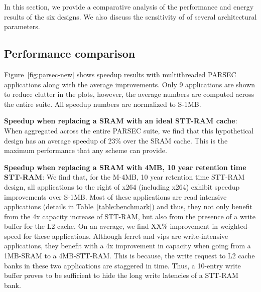 In this section, we provide a comparative analysis of the performance and energy results of the six designs.
We also discuss the sensitivity of of several architectural parameters.



\begin{figure*} [t]
\centering
 \caption{\label{fig:parsec-new} \scriptsize \bf Normalized speedup for PARSEC Applications }
\end{figure*}

\begin{figure*} [t]
\centering
 \caption{\label{fig:writebacks} \scriptsize \bf Number of Write backs normalized to M-4MB}
\end{figure*}


\subsection {Performance comparison}


Figure~\ref{fig:parsec-new} shows speedup results with multithreaded PARSEC
applications along with the average improvements. Only 9 applications are shown to reduce clutter in the plots, however,
the average numbers are computed across the entire suite. All speedup numbers are normalized to S-1MB.

{\bf Speedup when replacing a SRAM with an ideal STT-RAM cache}: When aggregated across the entire PARSEC suite, we find that this hypothetical design has an average speedup of 23\% over the SRAM cache. This is the maximum performance that any scheme can provide.

{\bf Speedup when replacing a SRAM with 4MB, 10 year retention time STT-RAM}: We find that, for the M-4MB, 10 year retention time STT-RAM design, all applications to the right of x264 (including x264) exhibit speedup improvements over S-1MB. Most of these applications are read intensive applications (details in Table~\ref{table:benchmark}) and thus, they not only benefit from the 4x capacity increase of STT-RAM, but also from the presence of a write buffer for the L2 cache. On an average, we find XX\% improvement in weighted-speed for these applications. Although ferret and vips are write-intensive applications, they benefit with a 4x improvement in capacity when going from a 1MB-SRAM to a 4MB-STT-RAM. This is because, the write request to L2 cache banks in these two applications are staggered in time. Thus, a 10-entry write buffer proves to be sufficient to hide the long write latencies of a STT-RAM bank.

